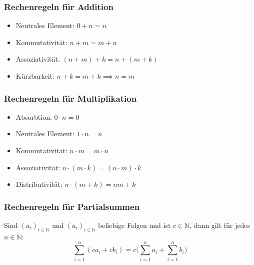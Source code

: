 \subsubsection{Rechenregeln für Addition}
\begin{itemize}
	\item Neutrales Element: $0 + n = n$
	\item Kommutativität: $n+m = m+ n$
	\item Assoziativität: $(n+m) + k = n + (m+k)$
	\item Kürzbarkeit: $n + k = m + k \implies n = m$
\end{itemize}

\subsubsection{Rechenregeln für Multiplikation}
\begin{itemize}
	\item Absorbtion: $0 \cdot n = 0$
	\item Neutrales Element: $1 \cdot n = n$
	\item Kommutativität: $n \cdot m = m \cdot n$
	\item Assoziativität: $n \cdot (m \cdot k) = (n \cdot m) \cdot k$
	\item Distributivität: $n \cdot (m + k) = nm + k$
\end{itemize}

\subsubsection{Rechenregeln für Partialsummen}
Sind $(a_i)_{i\in\mathbb{N}}$ und $(a_i)_{i\in\mathbb{N}}$ beliebige Folgen und ist $c\in\mathbb{N}$, dann gilt für jedes $n\in\mathbb{N}$:
\[
	\sum_{i=1}^n(ca_i+cb_i)=c\big(\sum_{i=1}^na_i+\sum_{i=1}^nb_i\big)
\]


